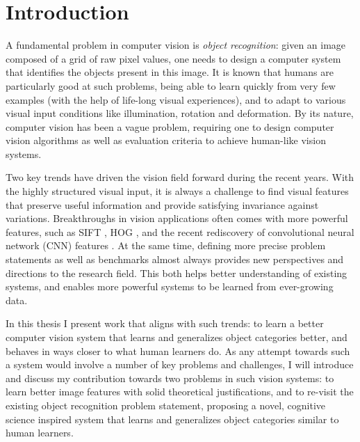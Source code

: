 \chapter{Introduction}

A fundamental problem in computer vision is \emph{object recognition}: given an image composed of a grid of raw pixel values, one needs to design a computer system that identifies the objects present in this image. It is known that humans are particularly good at such problems, being able to learn quickly from very few examples (with the help of life-long visual experiences), and to adapt to various visual input conditions like illumination, rotation and deformation. By its nature, computer vision has been a vague problem, requiring one to design computer vision algorithms as well as evaluation criteria to achieve human-like vision systems.

Two key trends have driven the vision field forward during the recent years. With the highly structured visual input, it is always a challenge to find visual features that preserve useful information and provide satisfying invariance against variations. Breakthroughs in vision applications often comes with more powerful features, such as SIFT \cite{ref:sift}, HOG \cite{hog}, and the recent rediscovery of convolutional neural network (CNN) features \cite{Krizhevsky2010,krizhevsky2012imagenet}. At the same time, defining more precise problem statements as well as benchmarks almost always provides new perspectives and directions to the research field. This both helps better understanding of existing systems, and enables more powerful systems to be learned from ever-growing data.

In this thesis I present work that aligns with such trends: to learn a better computer vision system that learns and generalizes object categories better, and behaves in ways closer to what human learners do. As any attempt towards such a system would involve a number of key problems and challenges, I will introduce and discuss my contribution towards two problems in such vision systems: to learn better image features with solid theoretical justifications, and to re-visit the existing object recognition problem statement, proposing a novel, cognitive science inspired system that learns and generalizes object categories similar to human learners. 

